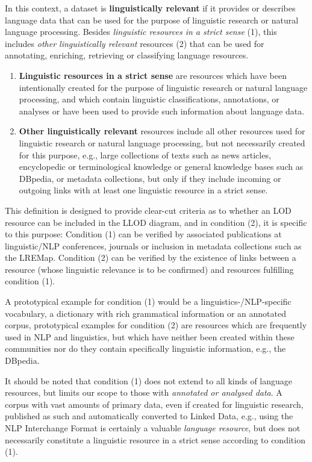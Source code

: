 In this context, a dataset is \textbf{linguistically relevant} if it provides or  describes language data that can be used for the purpose of linguistic research or natural language processing. Besides \emph{linguistic resources in  a strict sense} (1), this includes \emph{other linguistically relevant} resources (2) that can be used for  annotating, enriching, retrieving or classifying language resources.
\begin{enumerate}[(1)]
\item \textbf{Linguistic resources in a strict sense} are resources which have been intentionally created for the purpose of linguistic research or natural language processing, and which contain linguistic classifications, annotations, or analyses or have been used to provide such information about language data.
\item \textbf{Other linguistically relevant} resources include all other  resources used for linguistic research or natural language processing,  but not necessarily created for this purpose, e.g., large collections of  texts such as news articles, encyclopedic or terminological knowledge  or general knowledge bases such as DBpedia, or metadata collections, but only if they include incoming or outgoing links with at least one linguistic resource in a strict sense. 
\end{enumerate}

This definition is designed to provide clear-cut criteria as to whether an LOD resource can be included in the LLOD diagram, and in condition (2), it is specific to this purpose:
Condition (1) can be verified by associated publications at linguistic/NLP conferences, journals or inclusion in metadata collections such as the LREMap. 
Condition (2) can be verified by the existence of links between a resource (whose linguistic relevance is to be confirmed) and resources fulfilling condition (1).

A prototypical example for condition (1) would be a linguistics-/NLP-specific vocabulary, a dictionary with rich grammatical information or an annotated corpus, prototypical examples for condition (2) are resources which are frequently used in NLP and linguistics, but which have neither been created within these communities nor do they contain specifically linguistic information, e.g., the DBpedia.

It should be noted that condition (1) does not extend to all kinds of language resources, but limits our scope to those with \emph{annotated or analysed data}. 
A corpus with vast amounts of primary data, even if created for linguistic research, published as such and automatically converted to Linked Data, e.g., using the NLP Interchange Format
is certainly a valuable \emph{language resource}, but does not necessarily constitute a linguistic resource in a strict sense according to condition (1).

